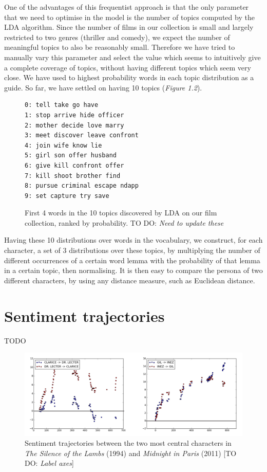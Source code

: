 \documentclass[bsc,frontabs,singlespacing,parskip]{infthesis} %
\begin{document}
One of the advantages of this frequentist approach is that the only parameter that we need to optimise in the model is the number of topics computed by the LDA algorithm. Since the number of films in our collection is small and largely restricted to two genres (thriller and comedy), we expect the number of meaningful topics to also be reasonably small. Therefore we have tried to manually vary this parameter and select the value which seems to intuitively give a complete coverage of topics, without having different topics which seem very close. We have used to highest probability words in each topic distribution as a guide. So far, we have settled on having 10 topics (\textit{Figure 1.2}).

\begin{figure}[h]
\centering
\begin{minipage}{8cm}
\begin{Verbatim}[frame=single]
0: tell take go have 
1: stop arrive hide officer 
2: mother decide love marry 
3: meet discover leave confront 
4: join wife know lie 
5: girl son offer husband 
6: give kill confront offer
7: kill shoot brother find 
8: pursue criminal escape ndapp
9: set capture try save 
\end{Verbatim}
\end{minipage}
\caption{First 4 words in the 10 topics discovered by LDA on our film collection, ranked by probability. TO DO: \textit{Need to update these}}
\label{topics}
\end{figure}

Having these 10 distributions over words in the vocabulary, we construct, for each character, a set of 3 distributions over these topics, by multiplying the number of different occurrences of a certain word lemma with the probability of that lemma in a certain topic, then normalising. It is then easy to compare the persona of two different characters, by using any distance measure, such as Euclidean distance.


\section{Sentiment trajectories}

TODO

\begin{figure}[h!]
	\includegraphics[scale=0.335]{figures/sentiment}
	\caption{Sentiment trajectories between the two most central characters in \textit{The Silence of the Lambs} (1994) and \textit{Midnight in Paris} (2011) [TO DO: \textit{Label axes}]}
\end{figure}
\end{document}
